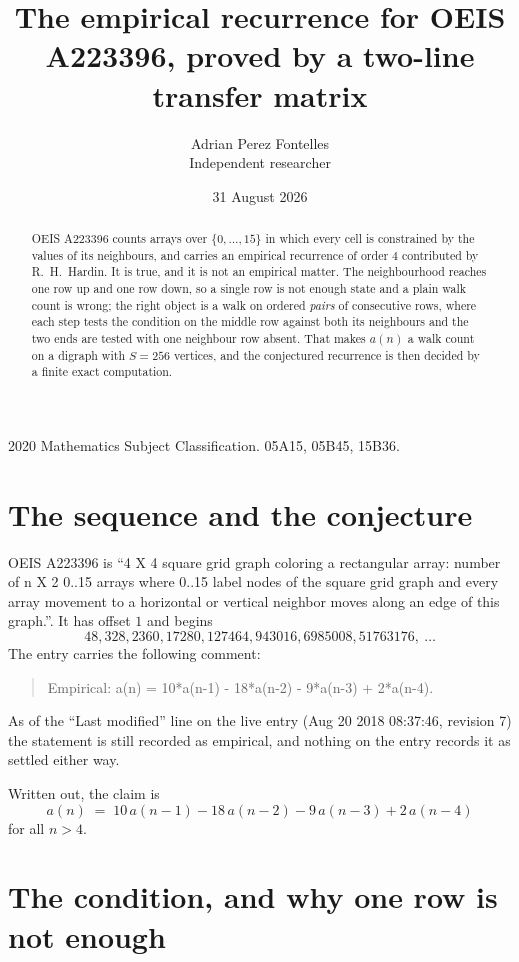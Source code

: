 \documentclass[11pt,a4paper]{article}
\title{The empirical recurrence for OEIS A223396, proved by a two-line transfer matrix}
\author{Adrian Perez Fontelles\\ \small Independent researcher}
\date{31 August 2026}
\theoremstyle{plain}
\theoremstyle{definition}
\begin{document}
\maketitle

\begin{abstract}
OEIS A223396 counts arrays over $\{0,\dots,15\}$ in which every cell is constrained by the
values of its neighbours, and carries an empirical recurrence of order $4$ contributed
by R.~H.~Hardin. It is true, and it is not an empirical matter. The neighbourhood reaches one
row up and one row down, so a single row is not enough state and a plain walk count
is wrong; the right object is a walk on ordered \emph{pairs} of consecutive rows, where
each step tests the condition on the middle row against both its neighbours and the two
ends are tested with one neighbour row absent. That makes $a(n)$ a walk count on a digraph
with $S=256$ vertices, and the conjectured recurrence is then decided by a finite exact
computation.
\end{abstract}

\noindent\small 2020 Mathematics Subject Classification. 05A15, 05B45, 15B36.\normalsize

\section{The sequence and the conjecture}

OEIS A223396 is ``4 X 4 square grid graph coloring a rectangular array: number of n X 2 0..15 arrays where 0..15 label nodes of the square grid graph and every array movement to a horizontal or vertical neighbor moves along an edge of this graph.''. It has offset $1$ and begins
\[
48, 328, 2360, 17280, 127464, 943016, 6985008, 51763176,\ \dots
\]
The entry carries the following comment:
\begin{quote}\small
Empirical: a(n) = 10*a(n-1) - 18*a(n-2) - 9*a(n-3) + 2*a(n-4).
\end{quote}
As of the ``Last modified'' line on the live entry (Aug 20 2018 08:37:46, revision 7) the statement is
still recorded as empirical, and nothing on the entry records it as settled either way.

Written out, the claim is
\begin{equation}\label{eq:conj}
a(n)\;=\;10\,a(n-1) - 18\,a(n-2) - 9\,a(n-3) + 2\,a(n-4)
\end{equation}
for all $n>4$.

\section{The condition, and why one row is not enough}
\end{document}
